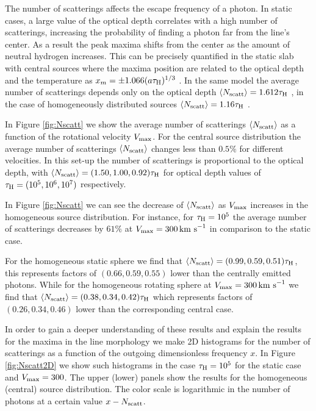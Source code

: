 \documentclass{emulateapj}
\newcommand{\ly}{{\ifmmode{{\rm Ly}\alpha~}\else{Ly$\alpha$~}\fi}}
\newcommand{\kms}{{\ifmmode{{\mathrm{\,km\ s}^{-1}}}\else{\,km~s$^{-1}$}\fi}}
\begin{document}
The number of scatterings affects the escape frequency of a \ly photon.
In static cases, a large value of the optical depth correlates with a
high number of scatterings, increasing the probability of finding a
\ly photon far from the line's center. As a result the peak maxima
shifts from the center as the amount of neutral hydrogen
increases. This can be precisely quantified in the static slab
with central sources where the maxima position are related to
the optical depth and the temperature as $x_{m}=\pm 1.066(a\tau_{\rm
  H})^{1/3}$ \citep{Harrington73}. In the same model the average
number of scatterings depends only on the optical depth $\langle
N_{\rm  scatt}\rangle=1.612\tau_{\rm   H}$
\citep{Adams72,Harrington73}, in the case of homogeneously distributed
sources $\langle N_{\rm   scatt}\rangle=1.16\tau_{\rm   H}$
\citep{Harrington73}.   



In Figure \ref{fig:Nscatt} we show the average number of scatterings
$\langle N_{\rm scatt}\rangle$ as a function of the rotational velocity
$V_{\rm max}$. For the central source distribution the average number of
scatterings $\langle N_{\rm   scatt}\rangle$ changes less than $0.5\%$
for different velocities. In this set-up the number of scatterings is
proportional to the optical depth, with $\langle N_{\rm
  scatt}\rangle= (1.50, 1.00, 0.92)\tau_{\rm   H}$ for optical depth
values of $\tau_{\rm H} = (10^{5}, 10^{6}, 10^{7})$ respectively.



In Figure \ref{fig:Nscatt} we can see the decrease of $\langle N_{\rm
  scatt}\rangle$ as $V_{\rm max}$ increases in the homogeneous
source distribution. For instance, for
$\tau_{\rm H}=10^5$ the average number of scatterings decreases by
$61\%$ at $V_{\rm max}=300\kms$ in comparison to the static case.  

For the homogeneous static sphere we find that $\langle N_{\rm
  scatt}\rangle= (0.99, 0.59, 0.51)\tau_{\rm   H}$, this
represents factors of $(0.66, 0.59, 0.55)$ lower than the centrally
emitted photons. While for the homogeneous rotating sphere at 
$V_{\rm{max}}=300\kms$ we find that $\langle N_{\rm
  scatt}\rangle=(0.38, 0.34, 0.42)\tau_{\rm   H}$ which represents 
  factors of $(0.26, 0.34, 0.46)$ lower than the corresponding central
  case.  

In order to gain a deeper understanding of these results and explain
the results for the maxima in the line morphology we make 2D
histograms for the number of scatterings as a function of the outgoing
dimensionless frequency $x$. In Figure \ref{fig:Nscatt2D} we show
such histograms in the case $\tau_{\rm H}=10^5$ for the
static case and $V_{\rm max}=300$\kms. The upper (lower) panels show the
results for the homogeneous (central) source distribution. The color
scale is logarithmic in the number of photons at a certain value
$x-N_{\rm scatt}$. 
\end{document}
